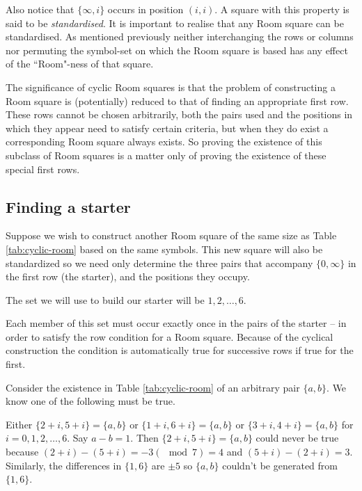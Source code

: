 \documentclass[
  11pt,
  a4paper]{book}
\begin{document}
Also notice that \(\{\infty,i\}\) occurs in position \((i,i)\).
A square with this property is said to be \emph{standardised}. It
is important to realise that any Room square can be
standardised. As mentioned previously neither interchanging
the rows or columns nor permuting the symbol-set on which
the Room square is based has any effect of the
``Room"-ness of that square.

The significance of cyclic Room squares is that the problem
of constructing a Room square is (potentially) reduced to
that of finding an appropriate first row. These rows cannot
be chosen arbitrarily, both the pairs used and the positions
in which they appear need to satisfy certain criteria, but
when they do exist a corresponding Room square always
exists. So proving the existence of this subclass of Room
squares is a matter only of proving the existence of these
special first rows.

\hypertarget{finding-a-starter}{%
\subsection{Finding a starter}\label{finding-a-starter}}

Suppose we wish to construct another Room square of the same
size as Table \ref{tab:cyclic-room} based on the same
symbols. This new square will also be standardized so we
need only determine the three pairs that accompany
\(\{0, \infty\}\) in the first row (the starter), and the
positions they occupy.

The set we will use to build our starter will be
\({1, 2, \ldots, 6}\).

Each member of this set must occur exactly once in the pairs
of the starter -- in order to satisfy the row condition for a
Room square. Because of the cyclical construction the
condition is automatically true for successive rows if true
for the first.

Consider the existence in Table \ref{tab:cyclic-room} of an
arbitrary pair \(\{a, b\}\). We know one of the following must be
true.

Either \(\{2 + i, 5 + i\} = \{a, b\}\) or \(\{1 + i, 6 + i\} = \{a, b\}\)
or \(\{3 + i, 4 + i\} = \{a, b\}\) for \(i = 0, 1, 2, \ldots, 6\).
Say \(a - b = 1\). Then \(\{2 + i, 5 + i\} = \{a, b\}\) could never be
true because \((2 + i) - (5 + i) = -3(\mod 7) = 4\) and
\((5 + i) - (2 + i) = 3\). Similarly, the differences in \(\{1, 6\}\)
are \(\pm 5\) so \(\{a, b\}\) couldn't be generated from \(\{1, 6\}\).
\end{document}
